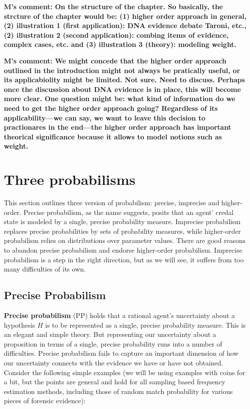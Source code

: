 \documentclass[
  10pt,
  dvipsnames,enabledeprecatedfontcommands]{scrartcl}
\begin{document}
\textbf{M's comment: On the structure of the chapter. So basically, the strcture of the chapter would be: (1) higher order approach in general, (2) illustration 1 (first application): DNA evidence debate Taroni, etc., (2) illustration 2 (second application): combing items of evidence, complex cases, etc. and (3)
illustration 3 (theory): modeling weight.}

\textbf{M's comment: We might concede that the higher order approach outlined in the introduction might not always be pratically useful, or its applicabiolity might be limited. Not sure. Need to discuss. Perhaps once the discussion about DNA evidence is in place, this will become more clear. One question might be: what kind of information do we need to get the higher order approach going? Regardless of its applicability---we can say, we want to leave this decision to practionares in the end---the higher order approach has important theorical significance because it allows to model notions such as weight.}

\hypertarget{three-probabilisms}{%
\section{Three probabilisms}\label{three-probabilisms}}

This section outlines three version of probabilism: precise, imprecise
and higher-order. Precise probabilism, as the name suggests, posits that
an agent' credal state is modeled by a single, precise probability
measure. Imprecise probabilism replaces precise probabilities by sets of
probability measures, while higher-order probabilism relies on
distributions over parameter values. There are good reasons to abandon
precise probabilism and endorse higher-order probabilism. Imprecise
probabilism is a step in the right direction, but as we will see, it
suffers from too many difficulties of its own.

\hypertarget{precise-probabilism}{%
\subsection{Precise Probabilism}\label{precise-probabilism}}

\textbf{Precise probabilism} (\textsf{PP}) holds that a rational agent's
uncertainty about a hypothesis \(H\) is to be represented as a single,
precise probability measure. This is an elegant and simple theory. But
representing our uncertainty about a proposition in terms of a single,
precise probability runs into a number of difficulties. Precise
probabilism fails to capture an important dimension of how our
uncertainty connects with the evidence we have or have not obtained.
Consider the following simple examples (we will be using examples with
coins for a bit, but the points are general and hold for all sampling
based frequency estimation methods, including those of random match
probability for various pieces of forensic evidence):
\end{document}
